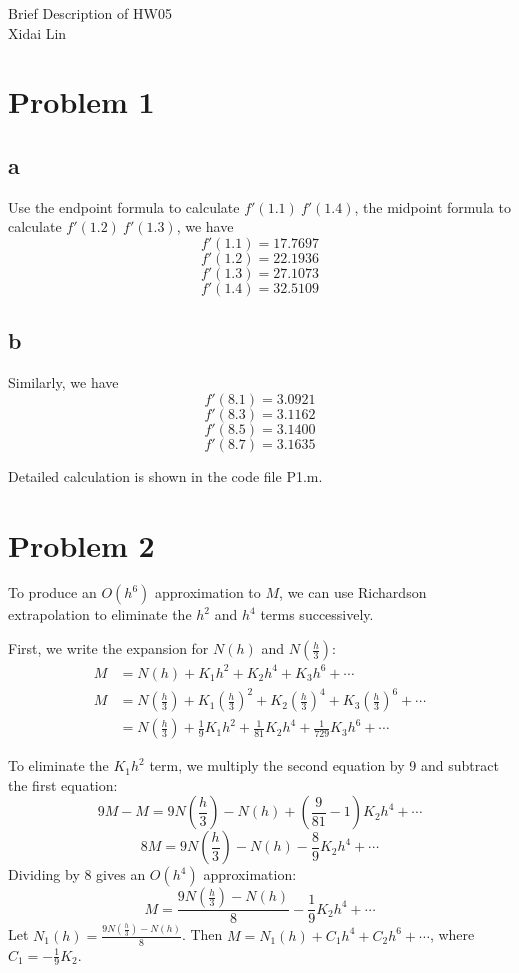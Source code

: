 \documentclass[11pt,a4paper]{report}
\theoremstyle{remark}
\begin{document}
\begin{center}
Brief Description of HW05 \\
Xidai Lin
\end{center}
\section*{Problem 1}
\subsection*{a}
Use the endpoint formula to calculate $f'(1.1) \ f'(1.4)$, the midpoint formula to calculate $f'(1.2) \ f'(1.3)$, we have
\[f'(1.1)=17.7697\]
\[f'(1.2)=22.1936\]
\[f'(1.3)=27.1073\] 
\[f'(1.4)=32.5109\]

\subsection*{b}
Similarly, we have
\[f'(8.1)=3.0921\]
\[f'(8.3)=3.1162\]
\[f'(8.5)=3.1400\]
\[f'(8.7)=3.1635\]

Detailed calculation is shown in the code file P1.m.
\section*{Problem 2}
To produce an \(O(h^6)\) approximation to \(M\), we can use Richardson extrapolation to eliminate the \(h^2\) and \(h^4\) terms successively.

First, we write the expansion for \(N(h)\) and \(N\left(\frac{h}{3}\right)\):
\begin{align}
M &= N(h) + K_1 h^2 + K_2 h^4 + K_3 h^6 + \cdots \\
M &= N\left(\frac{h}{3}\right) + K_1 \left(\frac{h}{3}\right)^2 + K_2 \left(\frac{h}{3}\right)^4 + K_3 \left(\frac{h}{3}\right)^6 + \cdots \nonumber \\
  &= N\left(\frac{h}{3}\right) + \frac{1}{9}K_1 h^2 + \frac{1}{81}K_2 h^4 + \frac{1}{729}K_3 h^6 + \cdots
\end{align}

To eliminate the \(K_1 h^2\) term, we multiply the second equation by 9 and subtract the first equation:
\begin{equation}
9M - M = 9N\left(\frac{h}{3}\right) - N(h) + \left(\frac{9}{81} - 1\right)K_2 h^4 + \cdots
\end{equation}
\begin{equation}
8M = 9N\left(\frac{h}{3}\right) - N(h) - \frac{8}{9}K_2 h^4 + \cdots
\end{equation}
Dividing by 8 gives an \(O(h^4)\) approximation:
\begin{equation}
M = \frac{9N(\frac{h}{3}) - N(h)}{8} - \frac{1}{9}K_2 h^4 + \cdots
\end{equation}
Let \(N_1(h) = \frac{9N(\frac{h}{3}) - N(h)}{8}\). Then \(M = N_1(h) + C_1 h^4 + C_2 h^6 + \cdots\), where \(C_1 = -\frac{1}{9}K_2\).
\end{document}

